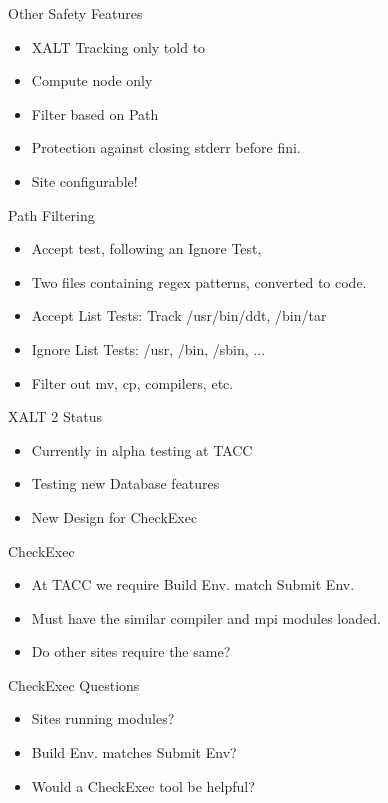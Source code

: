\documentclass{beamer}
\begin{document}
\begin{frame}{Other Safety Features}
  \begin{itemize}
    \item XALT Tracking only told to
    \item Compute node only
    \item Filter based on Path
    \item Protection against closing stderr before fini.
    \item Site configurable!
  \end{itemize}
\end{frame}

\begin{frame}{Path Filtering}
  \begin{itemize}
    \item Accept test, following an Ignore Test,
    \item Two files containing regex patterns, converted to code.
    \item Accept List Tests: Track /usr/bin/ddt, /bin/tar
    \item Ignore List Tests: /usr, /bin, /sbin, ...
    \item Filter out mv, cp, compilers, etc.
  \end{itemize}
\end{frame}

\begin{frame}{XALT 2 Status}
  \begin{itemize}
    \item Currently in alpha testing at TACC
    \item Testing new Database features
    \item New Design for CheckExec
  \end{itemize}
\end{frame}

\begin{frame}{CheckExec}
  \begin{itemize}
    \item At TACC we require Build Env. match Submit Env.
    \item Must have the similar compiler and mpi modules loaded.
    \item Do other sites require the same?
  \end{itemize}
\end{frame}

\begin{frame}{CheckExec Questions}
  \begin{itemize}
    \item Sites running modules?
    \item Build Env. matches Submit Env?
    \item Would a CheckExec tool be helpful?
  \end{itemize}
\end{frame}
\end{document}

